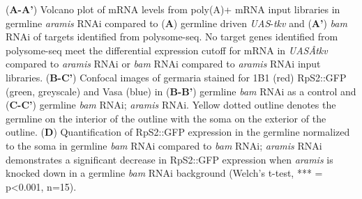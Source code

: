 \documentclass[12pt,oneside]{reedthesis}
\begin{document}
(\textbf{A-A'}) Volcano plot of mRNA levels from poly(A)+ mRNA
input libraries in germline \emph{aramis} RNAi compared to (\textbf{A}) germline
driven \emph{UAS}-\emph{tkv} and (\textbf{A'}) \emph{bam} RNAi of targets identified from
polysome-seq. No target genes identified from polysome-seq meet the
differential expression cutoff for mRNA in \emph{UASÂ­tkv} compared to
\emph{aramis} RNAi or \emph{bam} RNAi compared to \emph{aramis} RNAi input libraries.
(\textbf{B-C'}) Confocal images of germaria stained for 1B1 (red) RpS2::GFP
(green, greyscale) and Vasa (blue) in (\textbf{B-B'}) germline \emph{bam} RNAi as
a control and (\textbf{C-C'}) germline \emph{bam} RNAi; \emph{aramis} RNAi. Yellow
dotted outline denotes the germline on the interior of the outline with
the soma on the exterior of the outline. (\textbf{D}) Quantification of
RpS2::GFP expression in the germline normalized to the soma in germline
\emph{bam} RNAi compared to \emph{bam} RNAi; \emph{aramis} RNAi demonstrates a
significant decrease in RpS2::GFP expression when \emph{aramis} is knocked
down in a germline \emph{bam} RNAi background (Welch's t-test, *** =
p\textless0.001, n=15).
\end{document}

